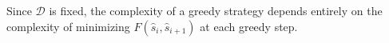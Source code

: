 \documentclass{siamart190516}
\begin{document}
Since $\mathcal{D}$ is fixed, the complexity of a greedy strategy depends entirely on the complexity of minimizing $F(\hat{s}_i, \hat{s}_{i+1})$ at each greedy step.  
\end{document}
